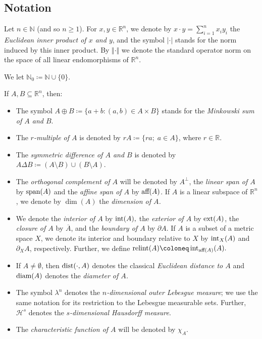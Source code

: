 \documentclass[pdflatex,sn-mathphys-num]{sn-jnl}
\theoremstyle{plain}
\theoremstyle{definition}
\DeclareMathOperator{\ext}{\textup{ext}}
\DeclareMathOperator{\inter}{\textup{int}}
\DeclareMathOperator{\LO}{\textup{span}}
\DeclareMathOperator{\relint}{\textup{relint}}
\DeclareMathOperator{\dist}{\textup{dist}}
\DeclareMathOperator{\aff}{\textup{aff}}
\DeclareMathOperator{\diam}{\textup{diam}}
\begin{document}
\subsection{Notation}
 Let $n\in\mathbb{N}$ (and so $n\geq1$). For $x, y\in\mathbb{R}^n$, we denote by $x\cdot y=\sum_{i=1}^{n}x_i y_i$ the \textit{Euclidean inner product of $x$ and $y$}, and the symbol $|\cdot|$ stands for the norm induced by this inner product. By $\Vert\cdot\Vert$ we denote the standard operator norm on the space of all linear endomorphisms of $\mathbb{R}^n$. 
 
 We let $\mathbb{N}_0\coloneqq\mathbb{N}\cup\{0\}.$

If $A, B\subseteq\mathbb{R}^n$, then: \begin{itemize}
    \item The symbol $A\oplus B\coloneq \{a+b: (a, b)\in A\times B\}$ stands for the \textit{Minkowski sum of $A$ and $B$}. 
    \item The \textit{$r$-multiple of $A$} is denoted by $rA\coloneq\{ra;\;a\in A\}$, where $r\in\mathbb{R}$.
    \item The \textit{symmetric difference of $A$ and $B$} is denoted by $A\Delta B\coloneq (A\setminus B)\cup(B\setminus A)$.
    \item The \textit{orthogonal complement of $A$} will be denoted by  $A^{\perp}$, the \textit{linear span of $A$} by $\LO (A)$ and the \textit{affine span of $A$} by $\aff(A)$. If $A$ is a linear subspace of $\mathbb{R}^n$, we denote by $\dim(A)$ the \emph{dimension of $A$.}
    \item We denote the \textit{interior of $A$} by $\inter (A),$ the \textit{exterior of $A$} by $\ext (A)$, the \emph{closure of $A$} by $\overline{A}$, and the \textit{boundary of $A$} 
    by $\partial A.$ If $A$ is a subset of a metric space $X$, we denote its interior and boundary relative to $X$ by
$\inter_X(A)$ and
$\partial_X A$, respectively. Further, we define $\relint(A)\coloneq\inter_{\aff(A)}(A).$
    \item If $A\neq\emptyset$, then $\dist(\cdot, A)$ denotes the classical \textit{Euclidean distance to $A$} and $\diam(A)$ denotes the \textit{diameter of $A$.}
    \item The symbol $\lambda^{n}$ denotes the \textit{$n$-dimensional outer Lebesgue measure}; we use the same notation for its restriction to the Lebesgue measurable sets. Further, $\mathcal{H}^{s}$ denotes the \textit{$s$-dimensional Hausdorff measure}.
    \item The \textit{characteristic function of $A$} will be denoted by  $\chi_A$.

\end{itemize} 
\end{document}
